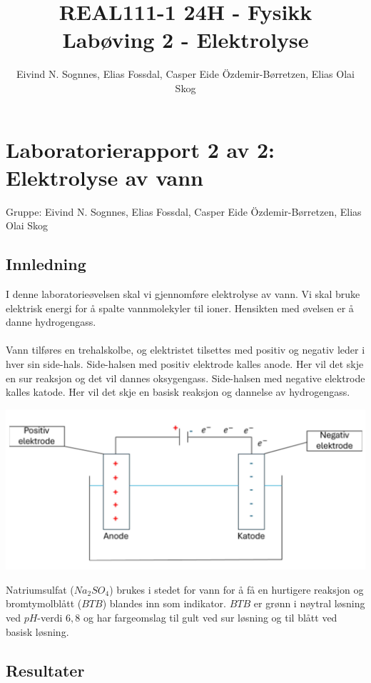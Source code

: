 \documentclass[norsk,11pt,a4paper]{report}
\title{REAL111-1 24H - Fysikk\\Labøving 2 - Elektrolyse}
\author{Eivind N. Sognnes, Elias Fossdal, Casper Eide Özdemir-Børretzen, Elias Olai Skog}
\date{}
\begin{document}



\section*{Laboratorierapport 2 av 2: Elektrolyse av vann}
Gruppe: Eivind N. Sognnes, Elias Fossdal, Casper Eide Özdemir-Børretzen, Elias Olai Skog

\subsection*{Innledning}
I denne laboratorieøvelsen skal vi gjennomføre elektrolyse av vann. Vi skal bruke elektrisk energi for å spalte vannmolekyler til ioner. Hensikten med øvelsen er å danne hydrogengass.\\\\
Vann tilføres en trehalskolbe, og elektristet tilsettes med positiv og negativ leder i hver sin side-hals. Side-halsen med positiv elektrode kalles anode. Her vil det skje en sur reaksjon og det vil dannes oksygengass. Side-halsen med negative elektrode kalles katode. Her vil det skje en basisk reaksjon og dannelse av hydrogengass.\\

\begin{center}
\includegraphics[scale=0.5]{elektrolyse1.png}
\end{center}

Natriumsulfat ($Na_2SO_4$) brukes i stedet for vann for å få en hurtigere reaksjon og bromtymolblått ($BTB$) blandes inn som indikator. $BTB$ er grønn i nøytral løsning ved $pH$-verdi $6,8$ og har fargeomslag til gult ved sur løsning og til blått ved basisk løsning.

\subsection*{Resultater}
\end{document}
